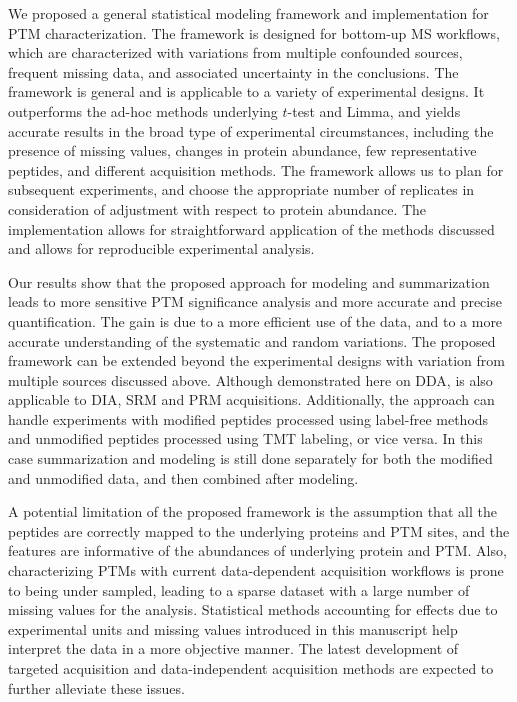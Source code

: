 \documentclass[mcp]{article}
\numberwithin{table}{section}
\begin{document}
We proposed a general statistical modeling framework and implementation for PTM characterization. The framework is designed for bottom-up MS workflows, which are characterized with variations from multiple confounded sources, frequent missing data, and associated uncertainty in the conclusions. The framework is general and is applicable to a variety of experimental designs. It outperforms the ad-hoc methods underlying $t$-test and Limma, and yields accurate results in the broad type of experimental circumstances, including the presence of missing values, changes in protein abundance, few representative peptides, and different acquisition methods. The framework allows us to plan for subsequent experiments, and choose the appropriate number of replicates in consideration of adjustment with respect to protein abundance. The implementation allows for straightforward application of the methods discussed and allows for reproducible experimental analysis.

Our results show that the proposed approach for modeling and summarization leads to more sensitive PTM significance analysis and more accurate and precise quantification. The gain is due to a more efficient use of the data, and to a more accurate understanding of the systematic and random variations. The proposed framework can be extended beyond the experimental designs with variation from multiple sources discussed above. Although demonstrated here on DDA, is also applicable to DIA, SRM and PRM acquisitions. Additionally, the approach can handle experiments with modified peptides processed using label-free methods and unmodified peptides processed using TMT labeling, or vice versa. In this case summarization and modeling is still done separately for both the modified and unmodified data, and then combined after modeling.

A potential limitation of the proposed framework is the assumption that all the peptides are correctly mapped to the underlying proteins and PTM sites, and the features are informative of the abundances of underlying protein and PTM. Also, characterizing PTMs with current data-dependent acquisition workflows is prone to being under sampled, leading to a sparse dataset with a large number of missing values for the analysis. Statistical methods accounting for effects due to experimental units and missing values introduced in this manuscript help interpret the data in a more objective manner. The latest development of targeted acquisition and data-independent acquisition methods are expected to further alleviate these issues. 
\end{document}
